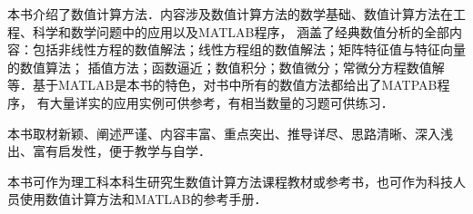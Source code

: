  \vspace*{0.0cm}
\thispagestyle{empty}
\vspace*{2.2cm}
\centerline{\hei{\color{darkblue}{内~容~简~介}}}\vspace{2cm}

本书介绍了数值计算方法．内容涉及数值计算方法的数学基础、数值计算方法在工程、科学和数学问题中的应用以及MATLAB程序，
涵盖了经典数值分析的全部内容：包括非线性方程的数值解法；线性方程组的数值解法；矩阵特征值与特征向量的数值算法；
插值方法；函数逼近；数值积分；数值微分；常微分方程数值解等．基于MATLAB是本书的特色，对书中所有的数值方法都给出了MATPAB程序，
有大量详实的应用实例可供参考，有相当数量的习题可供练习．

本书取材新颖、阐述严谨、内容丰富、重点突出、推导详尽、思路清晰、深入浅出、富有启发性，便于教学与自学．

本书可作为理工科本科生研究生数值计算方法课程教材或参考书，也可作为科技人员使用数值计算方法和MATLAB的参考手册．
